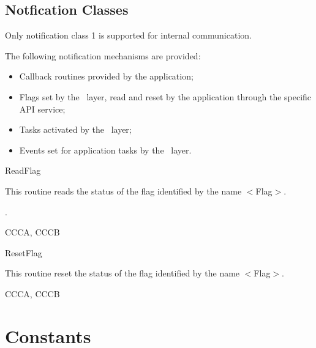 \subsection{Notfication Classes}
Only notification class 1 is supported for internal communication. 

The following notification mechanisms are provided:
\begin{itemize}
\item Callback routines provided by the application;
\item Flags set by the \os\ layer, read and reset by the application through the specific API service;\item Tasks activated by the \os\ layer;
\item Events set for application tasks by the \os\ layer.
\end{itemize}


\begin{function}{ReadFlag}
	\begin{fundescription}
	This routine reads the status of the flag identified by the name $<$Flag$>$.
   	\end{fundescription}
  	\begin{funreturn}
   	.
   	\end{funreturn}
	\begin{funconformance}
     	CCCA, CCCB
     	\end{funconformance}
\end{function}

\begin{function}{ResetFlag}
	\begin{fundescription}
	This routine reset the status of the flag identified by the name $<$Flag$>$.
   	\end{fundescription}

	\begin{funconformance}
     	CCCA, CCCB
     	\end{funconformance}
\end{function}


\pagebreak

\section{Constants}
\label{sec:constants}

